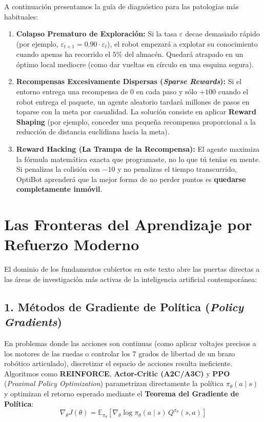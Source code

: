 A continuación presentamos la guía de diagnóstico para las patologías más habituales:
\begin{enumerate}
  \item \textbf{Colapso Prematuro de Exploración:} Si la tasa $\varepsilon$ decae demasiado rápido (por ejemplo, $\varepsilon_{t+1} = 0.90 \cdot \varepsilon_t$), el robot empezará a explotar su conocimiento cuando apenas ha recorrido el $5\%$ del almacén. Quedará atrapado en un óptimo local mediocre (como dar vueltas en círculo en una esquina segura).
  \item \textbf{Recompensas Excesivamente Dispersas (\textit{Sparse Rewards}):} Si el entorno entrega una recompensa de $0$ en cada paso y sólo $+100$ cuando el robot entrega el paquete, un agente aleatorio tardará millones de pasos en toparse con la meta por casualidad. La solución consiste en aplicar \textbf{Reward Shaping} (por ejemplo, conceder una pequeña recompensa proporcional a la reducción de distancia euclidiana hacia la meta).
  \item \textbf{Reward Hacking (La Trampa de la Recompensa):} El agente maximiza la fórmula matemática exacta que programaste, no lo que tú tenías en mente. Si penalizas la colisión con $-10$ y no penalizas el tiempo transcurrido, OptiBot aprenderá que la mejor forma de no perder puntos es \textbf{quedarse completamente inmóvil}.
\end{enumerate}

\section{Las Fronteras del Aprendizaje por Refuerzo Moderno}
El dominio de los fundamentos cubiertos en este texto abre las puertas directas a las áreas de investigación más activas de la inteligencia artificial contemporánea:

\subsection{1. Métodos de Gradiente de Política (\textit{Policy Gradients})}
En problemas donde las acciones son continuas (como aplicar voltajes precisos a los motores de las ruedas o controlar los 7 grados de libertad de un brazo robótico articulado), discretizar el espacio de acciones resulta ineficiente. Algoritmos como \textbf{REINFORCE}, \textbf{Actor-Critic (A2C/A3C)} y \textbf{PPO} (\textit{Proximal Policy Optimization}) parametrizan directamente la política $\pi_\theta(a \mid s)$ y optimizan el retorno esperado mediante el \textbf{Teorema del Gradiente de Política}:
\begin{equation}
  \nabla_\theta J(\theta) = \mathbb{E}_{\pi_\theta} \left[ \nabla_\theta \log \pi_\theta(a \mid s) \, Q^{\pi_\theta}(s, a) \right]
\end{equation}

